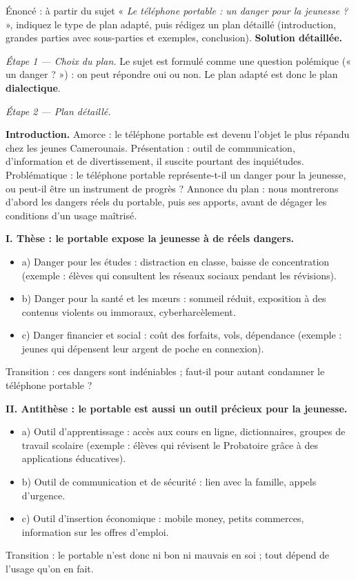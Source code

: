 \documentclass[11pt]{article}
\begin{document}
\begin{exoresolu}
Énoncé : à partir du sujet « \emph{Le téléphone portable : un danger pour la jeunesse ?} », indiquez le type de plan adapté, puis rédigez un plan détaillé (introduction, grandes parties avec sous-parties et exemples, conclusion).
\tcblower
\textbf{Solution détaillée.}

\emph{Étape 1 — Choix du plan.} Le sujet est formulé comme une question polémique (« un danger ? ») : on peut répondre oui ou non. Le plan adapté est donc le plan \textbf{dialectique}.

\emph{Étape 2 — Plan détaillé.}

\textbf{Introduction.} Amorce : le téléphone portable est devenu l'objet le plus répandu chez les jeunes Camerounais. Présentation : outil de communication, d'information et de divertissement, il suscite pourtant des inquiétudes. Problématique : le téléphone portable représente-t-il un danger pour la jeunesse, ou peut-il être un instrument de progrès ? Annonce du plan : nous montrerons d'abord les dangers réels du portable, puis ses apports, avant de dégager les conditions d'un usage maîtrisé.

\textbf{I. Thèse : le portable expose la jeunesse à de réels dangers.}
\begin{itemize}
\item a) Danger pour les études : distraction en classe, baisse de concentration (exemple : élèves qui consultent les réseaux sociaux pendant les révisions).
\item b) Danger pour la santé et les mœurs : sommeil réduit, exposition à des contenus violents ou immoraux, cyberharcèlement.
\item c) Danger financier et social : coût des forfaits, vols, dépendance (exemple : jeunes qui dépensent leur argent de poche en connexion).
\end{itemize}
Transition : ces dangers sont indéniables ; faut-il pour autant condamner le téléphone portable ?

\textbf{II. Antithèse : le portable est aussi un outil précieux pour la jeunesse.}
\begin{itemize}
\item a) Outil d'apprentissage : accès aux cours en ligne, dictionnaires, groupes de travail scolaire (exemple : élèves qui révisent le Probatoire grâce à des applications éducatives).
\item b) Outil de communication et de sécurité : lien avec la famille, appels d'urgence.
\item c) Outil d'insertion économique : mobile money, petits commerces, information sur les offres d'emploi.
\end{itemize}
Transition : le portable n'est donc ni bon ni mauvais en soi ; tout dépend de l'usage qu'on en fait.


\end{exoresolu}
\end{document}
